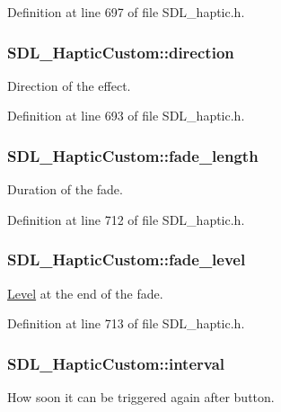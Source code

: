 Definition at line 697 of file S\-D\-L\-\_\-haptic.\-h.

\hypertarget{struct_s_d_l___haptic_custom_ad7eb84f59404d9e0da07570b4b57dd43}{
\subsubsection[{direction}]{ S\-D\-L\-\_\-\-Haptic\-Custom\-::direction}}\label{struct_s_d_l___haptic_custom_ad7eb84f59404d9e0da07570b4b57dd43}
Direction of the effect. 

Definition at line 693 of file S\-D\-L\-\_\-haptic.\-h.

\hypertarget{struct_s_d_l___haptic_custom_ab47fac94baeba28a3acd6c706e0b6a5c}{
\subsubsection[{fade\-\_\-length}]{ S\-D\-L\-\_\-\-Haptic\-Custom\-::fade\-\_\-length}}\label{struct_s_d_l___haptic_custom_ab47fac94baeba28a3acd6c706e0b6a5c}
Duration of the fade. 

Definition at line 712 of file S\-D\-L\-\_\-haptic.\-h.

\hypertarget{struct_s_d_l___haptic_custom_a73a522581eb514d032e500ec6294fe50}{
\subsubsection[{fade\-\_\-level}]{ S\-D\-L\-\_\-\-Haptic\-Custom\-::fade\-\_\-level}}\label{struct_s_d_l___haptic_custom_a73a522581eb514d032e500ec6294fe50}
\hyperlink{class_level}{Level} at the end of the fade. 

Definition at line 713 of file S\-D\-L\-\_\-haptic.\-h.

\hypertarget{struct_s_d_l___haptic_custom_afdeb26b1709254545e00a59a0a6c360c}{
\subsubsection[{interval}]{ S\-D\-L\-\_\-\-Haptic\-Custom\-::interval}}\label{struct_s_d_l___haptic_custom_afdeb26b1709254545e00a59a0a6c360c}
How soon it can be triggered again after button. 

